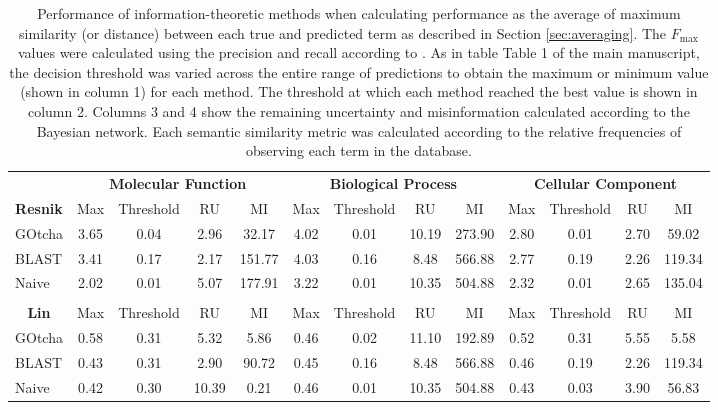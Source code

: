 \begin{table}[h!]
\caption{Performance of information-theoretic methods when calculating performance as the average of maximum similarity (or distance) between each true and predicted term as described in Section \ref{sec:averaging}. The $F_{\max}$ values were calculated using the precision and recall according to \citet{Verspoor2006}. As in table Table 1 of the main manuscript, the decision threshold was varied across the entire range of predictions to obtain the maximum or minimum value (shown in column 1) for each method. The threshold at which each method reached the best value is shown in column 2. Columns 3 and 4 show the remaining uncertainty and misinformation calculated according to the Bayesian network. Each semantic similarity metric was calculated according to the relative frequencies of observing each term in the database.
\label{Tab:S01}}
\resizebox{\columnwidth}{!}
{\begin{tabular}{c|cccc|cccc|cccc}

\multicolumn{1}{l}{\hphantom} &\multicolumn{4}{c}{\bf Molecular Function } & \multicolumn{4}{c}{\bf Biological Process} &  \multicolumn{4}{c}{\bf Cellular Component } \\


\bf Resnik & Max & Threshold & RU & MI & Max & Threshold & RU & MI & Max & Threshold & RU & MI\\
\hline
\multicolumn{1}{l|}{GOtcha}& 3.65 & 0.04 & 2.96 & 32.17 & 4.02 & 0.01 & 10.19 & 273.90 & 2.80 & 0.01 & 2.70 & 59.02 \\
\multicolumn{1}{l|}{BLAST}& 3.41 & 0.17 & 2.17 & 151.77 & 4.03 & 0.16 & 8.48 & 566.88 & 2.77 & 0.19 & 2.26 & 119.34 \\
\multicolumn{1}{l|}{Naive}& 2.02 & 0.01 & 5.07 & 177.91 & 3.22 & 0.01 & 10.35 & 504.88 & 2.32 & 0.01 & 2.65 & 135.04 \\


\multicolumn{1}{l}{\hphantom} & & & &\multicolumn{1}{c}{\hphantom} & & & & \multicolumn{1}{c}{\hphantom} & & & &\\

\bf Lin & Max & Threshold & RU & MI & Max & Threshold & RU & MI & Max & Threshold & RU & MI\\
\hline
\multicolumn{1}{l|}{GOtcha}& 0.58 & 0.31 & 5.32 & 5.86 & 0.46 & 0.02 & 11.10 & 192.89 & 0.52 & 0.31 & 5.55 & 5.58 \\
\multicolumn{1}{l|}{BLAST}& 0.43 & 0.31 & 2.90 & 90.72 & 0.45 & 0.16 & 8.48 & 566.88 & 0.46 & 0.19 & 2.26 & 119.34 \\
\multicolumn{1}{l|}{Naive}& 0.42 & 0.30 & 10.39 & 0.21 & 0.46 & 0.01 & 10.35 & 504.88 & 0.43 & 0.03 & 3.90 & 56.83 \\



\end{tabular}}
\end{table}
